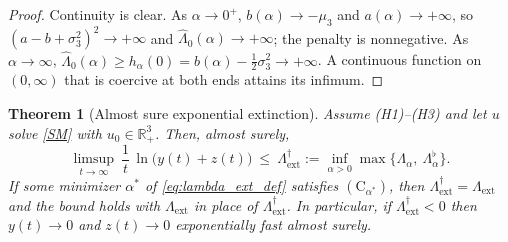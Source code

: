 \documentclass{article}
\newtheorem{theorem}{Theorem}[section]
\newcommand{\Lext}{\Lambda_{\mathrm{ext}}}
\newcommand{\Lsharp}{\Lambda_{\mathrm{ext}}^{\dagger}}
\begin{document}
\begin{proof}
Continuity is clear. As $\alpha\to0^+$, $b(\alpha)\to-\mu_3$ and $a(\alpha)\to+\infty$, so $(a-b+\sigma_3^2)^2\to+\infty$ and $\widehat\Lambda_0(\alpha)\to+\infty$; the penalty is nonnegative. As $\alpha\to\infty$, $\widehat\Lambda_0(\alpha)\ge h_\alpha(0)=b(\alpha)-\tfrac12\sigma_3^2\to+\infty$. A continuous function on $(0,\infty)$ that is coercive at both ends attains its infimum.
\end{proof}

\begin{theorem}[Almost sure exponential extinction]\label{Syz}
Assume (H1)--(H3) and let $u$ solve \eqref{SM} with $u_0\in\mathbb{R}^3_+$. Then, almost surely,
\begin{equation}\label{eq:main_extinction}
\limsup_{t\to\infty}\ \frac1t\,\ln\big(y(t)+z(t)\big)\ \le\ \Lsharp:=\inf_{\alpha>0}\max\big\{\Lambda_\alpha,\ \Lambda_\alpha^{\flat}\big\}.
\end{equation}
If some minimizer $\alpha^\ast$ of \eqref{eq:lambda_ext_def} satisfies $(\mathrm{C}_{\alpha^\ast})$, then $\Lsharp=\Lext$ and the bound holds with $\Lext$ in place of $\Lsharp$. In particular, if $\Lsharp<0$ then $y(t)\to0$ and $z(t)\to0$ exponentially fast almost surely.
\end{theorem}
\end{document}
